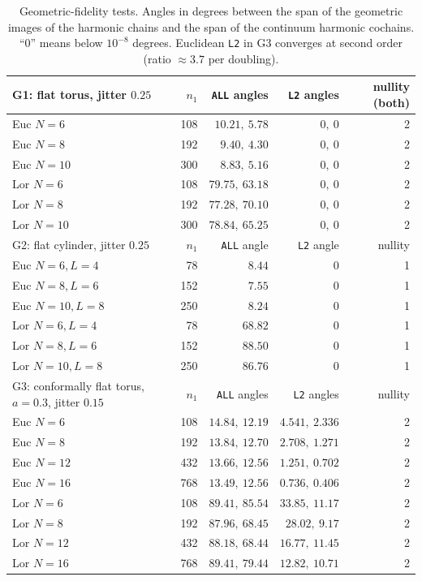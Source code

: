 \documentclass[11pt]{article}
\theoremstyle{definition}
\theoremstyle{plain}
\theoremstyle{remark}
\newcommand{\ttt}[1]{\texttt{#1}}
\begin{document}
\begin{table}[ht]\centering\small
\begin{tabular}{@{}lrrrr@{}}
\toprule
G1: flat torus, jitter \(0.25\) & \(n_1\) & \ttt{ALL} angles & \ttt{L2} angles & nullity (both) \\
\midrule
Euc \(N=6\) & 108 & \(10.21,\ 5.78\) & \(0,\ 0\) & 2 \\
Euc \(N=8\) & 192 & \(9.40,\ 4.30\) & \(0,\ 0\) & 2 \\
Euc \(N=10\) & 300 & \(8.83,\ 5.16\) & \(0,\ 0\) & 2 \\
Lor \(N=6\) & 108 & \(79.75,\ 63.18\) & \(0,\ 0\) & 2 \\
Lor \(N=8\) & 192 & \(77.28,\ 70.10\) & \(0,\ 0\) & 2 \\
Lor \(N=10\) & 300 & \(78.84,\ 65.25\) & \(0,\ 0\) & 2 \\
\midrule
G2: flat cylinder, jitter \(0.25\) & \(n_1\) & \ttt{ALL} angle & \ttt{L2} angle & nullity \\
\midrule
Euc \(N=6,L=4\) & 78 & \(8.44\) & \(0\) & 1 \\
Euc \(N=8,L=6\) & 152 & \(7.55\) & \(0\) & 1 \\
Euc \(N=10,L=8\) & 250 & \(8.24\) & \(0\) & 1 \\
Lor \(N=6,L=4\) & 78 & \(68.82\) & \(0\) & 1 \\
Lor \(N=8,L=6\) & 152 & \(88.50\) & \(0\) & 1 \\
Lor \(N=10,L=8\) & 250 & \(86.76\) & \(0\) & 1 \\
\midrule
G3: conformally flat torus, \(a=0.3\), jitter \(0.15\) & \(n_1\) & \ttt{ALL} angles & \ttt{L2} angles & nullity \\
\midrule
Euc \(N=6\) & 108 & \(14.84,\ 12.19\) & \(4.541,\ 2.336\) & 2 \\
Euc \(N=8\) & 192 & \(13.84,\ 12.70\) & \(2.708,\ 1.271\) & 2 \\
Euc \(N=12\) & 432 & \(13.66,\ 12.56\) & \(1.251,\ 0.702\) & 2 \\
Euc \(N=16\) & 768 & \(13.49,\ 12.56\) & \(0.736,\ 0.406\) & 2 \\
Lor \(N=6\) & 108 & \(89.41,\ 85.54\) & \(33.85,\ 11.17\) & 2 \\
Lor \(N=8\) & 192 & \(87.96,\ 68.45\) & \(28.02,\ 9.17\) & 2 \\
Lor \(N=12\) & 432 & \(88.18,\ 68.44\) & \(16.77,\ 11.45\) & 2 \\
Lor \(N=16\) & 768 & \(89.41,\ 79.44\) & \(12.82,\ 10.71\) & 2 \\
\bottomrule
\end{tabular}
\caption{Geometric-fidelity tests. Angles in degrees between the span of the geometric images of the harmonic chains and the span of the continuum harmonic cochains. ``0'' means below \(10^{-8}\) degrees. Euclidean \ttt{L2} in G3 converges at second order (ratio \(\approx3.7\) per doubling).}
\label{tab:G}
\end{table}
\end{document}
